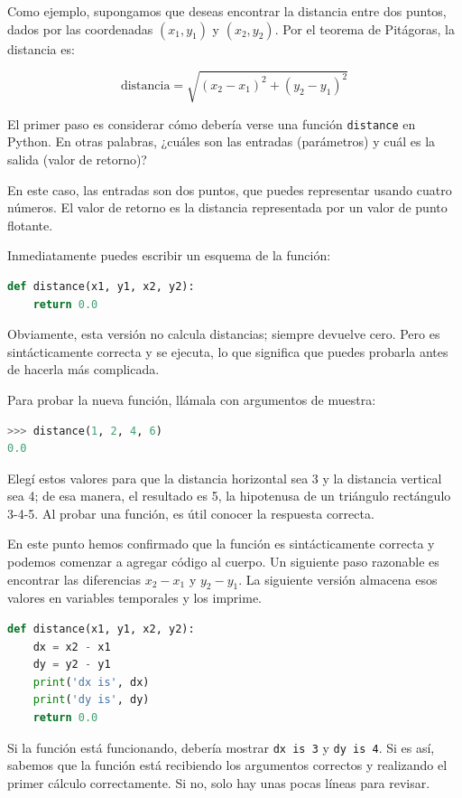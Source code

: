 Como ejemplo, supongamos que deseas encontrar la distancia entre dos puntos, dados por las coordenadas $(x_1, y_1)$ y $(x_2, y_2)$. Por el teorema de Pitágoras, la distancia es:

\[
\text{distancia} = \sqrt{(x_2 - x_1)^2 + (y_2 - y_1)^2}
\]

El primer paso es considerar cómo debería verse una función \texttt{distance} en Python. En otras palabras, ¿cuáles son las entradas (parámetros) y cuál es la salida (valor de retorno)?

En este caso, las entradas son dos puntos, que puedes representar usando cuatro números. El valor de retorno es la distancia representada por un valor de punto flotante.

Inmediatamente puedes escribir un esquema de la función:

\begin{lstlisting}[language=Python]
def distance(x1, y1, x2, y2):
    return 0.0
\end{lstlisting}

Obviamente, esta versión no calcula distancias; siempre devuelve cero. Pero es sintácticamente correcta y se ejecuta, lo que significa que puedes probarla antes de hacerla más complicada.

Para probar la nueva función, llámala con argumentos de muestra:

\begin{lstlisting}[language=Python]
>>> distance(1, 2, 4, 6)
0.0
\end{lstlisting}

Elegí estos valores para que la distancia horizontal sea 3 y la distancia vertical sea 4; de esa manera, el resultado es 5, la hipotenusa de un triángulo rectángulo 3-4-5. Al probar una función, es útil conocer la respuesta correcta.

En este punto hemos confirmado que la función es sintácticamente correcta y podemos comenzar a agregar código al cuerpo. Un siguiente paso razonable es encontrar las diferencias $x_2 - x_1$ y $y_2 - y_1$. La siguiente versión almacena esos valores en variables temporales y los imprime.

\begin{lstlisting}[language=Python]
def distance(x1, y1, x2, y2):
    dx = x2 - x1
    dy = y2 - y1
    print('dx is', dx)
    print('dy is', dy)
    return 0.0
\end{lstlisting}

Si la función está funcionando, debería mostrar \texttt{dx is 3} y \texttt{dy is 4}. Si es así, sabemos que la función está recibiendo los argumentos correctos y realizando el primer cálculo correctamente. Si no, solo hay unas pocas líneas para revisar.

